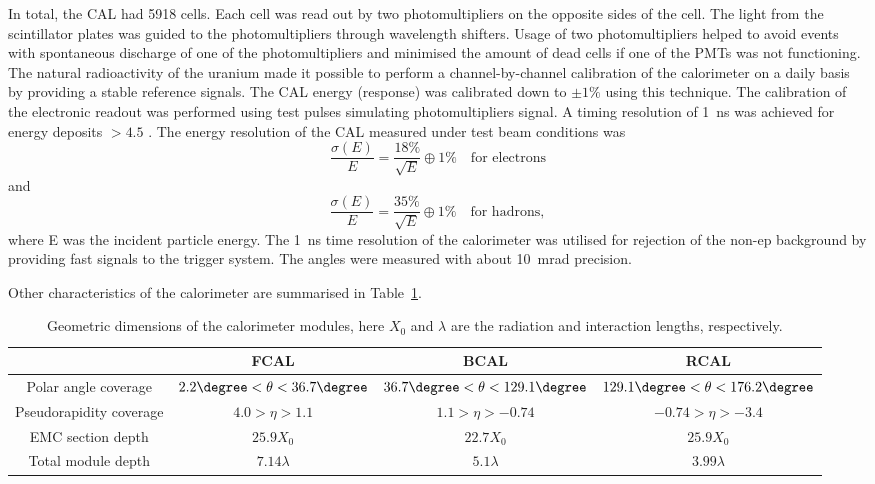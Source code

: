 In total, the CAL had 5918 cells. Each cell was read out by two photomultipliers on the opposite sides of the cell. The light from the scintillator plates was guided to the photomultipliers through wavelength shifters. Usage of two photomultipliers helped to avoid events with spontaneous discharge of one of the photomultipliers and minimised the amount of dead cells if one of the PMTs was not functioning.
The natural radioactivity of the uranium made it possible to perform a channel-by-channel calibration of the calorimeter on a daily basis by providing a stable reference signals. The CAL energy (response) was calibrated down to $\pm 1\%$ using this technique. The calibration of the electronic readout was performed using test pulses simulating photomultipliers signal. A timing resolution of 1~ns was achieved for energy deposits $> 4.5$ \GeV.
The energy resolution of the CAL measured under test beam conditions was 
\begin{equation}
	\frac{\sigma \left(E\right)}{E} = \frac{18\%}{\sqrt{E}} \oplus 1\% \quad \text{for electrons}
\end{equation}
and 
\begin{equation}
	\frac{\sigma \left(E\right)}{E} = \frac{35\%}{\sqrt{E}} \oplus 1\% \quad \text{for hadrons},
\end{equation}
where E was the incident particle energy. The 1~ns time resolution of the calorimeter was utilised for rejection of the non-ep background by providing fast signals to the trigger system. The angles were measured with about 10~mrad precision.

Other characteristics of the \zeus calorimeter are summarised in Table~\ref{tab:calparams}.

\begin{table}[htbp]
	\centering
	{\small
		\begin{tabular}{|c|c|c|c|}
			     \hline
      &FCAL & BCAL & RCAL \\
			\hline
			\hline
			Polar angle coverage & $2.2\degree < \theta < 36.7\degree$ & $36.7\degree < \theta < 129.1\degree$ & $129.1\degree < \theta < 176.2\degree$ \\ \hline
			Pseudorapidity coverage & $4.0 > \eta > 1.1$ & $1.1 > \eta > -0.74$ & $-0.74 > \eta > -3.4$ \\ \hline
			EMC section depth & $25.9 X_0$ & $22.7 X_0$ & $25.9 X_0$ \\ \hline
			Total module depth & $7.14 \lambda$ & $5.1 \lambda$ & $3.99 \lambda$ \\ \hline		
		\end{tabular}
	}
	\caption{Geometric dimensions of the calorimeter modules, here $X_0$ and $\lambda$ are the radiation and interaction lengths, respectively.}
	\label{tab:calparams}
\end{table}

